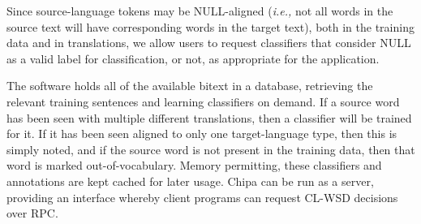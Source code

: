 Since source-language tokens may be NULL-aligned (\emph{i.e.,} not all words in
the source text will have corresponding words in the target text), both in the
training data and in translations, we allow users to request classifiers that
consider NULL as a valid label for classification, or not, as appropriate for
the application.

The software holds all of the available bitext in a database, retrieving the
relevant training sentences and learning classifiers on demand.
If a source word has been seen with multiple different translations, then a
classifier will be trained for it. If it has been seen aligned to only one
target-language type, then this is simply noted, and if the source word is not
present in the training data, then that word is marked out-of-vocabulary.
Memory permitting, these classifiers and annotations are kept cached for later
usage. Chipa can be run as a server, providing an interface whereby client
programs can request CL-WSD decisions over RPC.



